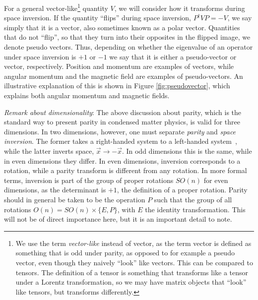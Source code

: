 For a general vector-like\footnote{We use the term \emph{vector-like} instead of vector, as the term vector is defined as something that is odd under parity, as opposed to for example a pseudo vector, even though they naively ``look'' like vectors. This can be compared to tensors. The definition of a tensor is something that transforms like a tensor under a Lorentz transformation, so we may have matrix objects that ``look'' like tensors, but transforms differently.} quantity $V$, we will consider how it transforms during space inversion.
If the quantity ``flips'' during space inversion, $P^\dagger V P = -V$, we say simply that it is a vector, also sometimes known as a polar vector.
Quantities that do not ``flip'', so that they turn into their opposites in the flipped image, we denote pseudo vectors.
Thus, depending on whether the eigenvalue of an operator under space inversion is $+1$ or $-1$ we say that it is either a pseudo-vector or vector, respectively.
Position and momentum are examples of vectors, while angular momentum and the magnetic field are examples of pseudo-vectors.
An illustrative explanation of this is shown in Figure \ref{fig:pseudovector}, which explains both angular momentum and magnetic fields.

\emph{Remark about dimensionality}: The above discussion about parity, which is the standard way to present parity in condensed matter physics, is valid for three dimensions.
In two dimensions, however, one must separate \emph{parity} and \emph{space inversion}.
The former takes a right-handed system to a left-handed system~\cite{sakuraiModernQuantumMechanics2017}, while the latter inverts space, $\vec{x} \to  -\vec{x}$.
In odd dimensions this is the same, while in even dimensions they differ.
In even dimensions, inversion corresponds to a rotation, while a parity transform is different from any rotation.
In more formal terms, inversion is part of the group of proper  rotations $SO(n)$ for even dimensions, as the determinant is $+1$, the definition of a proper rotation.
Parity should in general be taken to be the operation $P$ such that the group of all rotations $O(n) = SO(n) \times \{E, P\}$, with $E$ the identity transformation.
This will not be of direct importance here, but it is an important detail to note.

